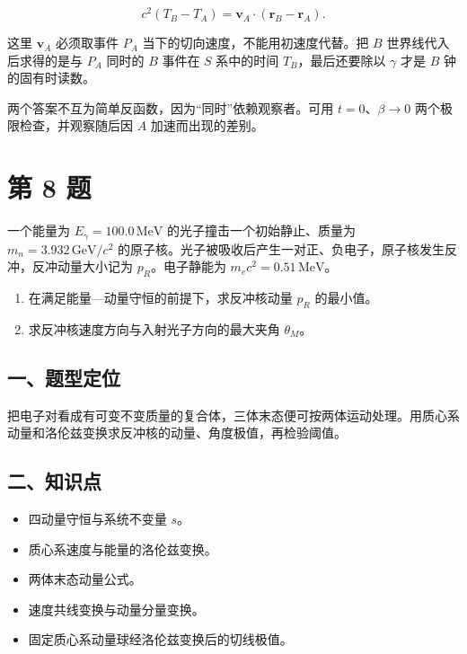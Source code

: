\documentclass[12pt,a4paper,UTF8]{ctexart}
\newcommand{\tightlist}{\setlength{\itemsep}{0pt}\setlength{\parskip}{0pt}}
\begin{document}
\[c^2(T_B-T_A)=\boldsymbol v_A\cdot(\boldsymbol r_B-\boldsymbol r_A).\]

这里 \(\boldsymbol v_A\) 必须取事件 \(P_A\)
当下的切向速度，不能用初速度代替。把 \(B\) 世界线代入后求得的是与
\(P_A\) 同时的 \(B\) 事件在 \(S\) 系中的时间 \(T_B\)，最后还要除以
\(\gamma\) 才是 \(B\) 钟的固有时读数。

两个答案不互为简单反函数，因为``同时''依赖观察者。可用
\(t=0\)、\(\beta\to0\) 两个极限检查，并观察随后因 \(A\)
加速而出现的差别。

\newpage

\section{第 8 题}\label{ux7b2c-8-ux9898}

一个能量为 \(E_\gamma=100.0\,\mathrm{MeV}\)
的光子撞击一个初始静止、质量为 \(m_n=3.932\,\mathrm{GeV}/c^2\)
的原子核。光子被吸收后产生一对正、负电子，原子核发生反冲，反冲动量大小记为
\(p_R\)。电子静能为 \(m_ec^2=0.51\,\mathrm{MeV}\)。

\begin{enumerate}
\def\labelenumi{\arabic{enumi}.}
\tightlist
\item
  在满足能量---动量守恒的前提下，求反冲核动量 \(p_R\) 的最小值。
\item
  求反冲核速度方向与入射光子方向的最大夹角 \(\theta_M\)。
\end{enumerate}

\subsection{一、题型定位}\label{ux4e00ux9898ux578bux5b9aux4f4d-7}

把电子对看成有可变不变质量的复合体，三体末态便可按两体运动处理。用质心系动量和洛伦兹变换求反冲核的动量、角度极值，再检验阈值。

\subsection{二、知识点}\label{ux4e8cux77e5ux8bc6ux70b9-7}

\begin{itemize}
\tightlist
\item
  四动量守恒与系统不变量 \(s\)。
\item
  质心系速度与能量的洛伦兹变换。
\item
  两体末态动量公式。
\item
  速度共线变换与动量分量变换。
\item
  固定质心系动量球经洛伦兹变换后的切线极值。
\end{itemize}
\end{document}
